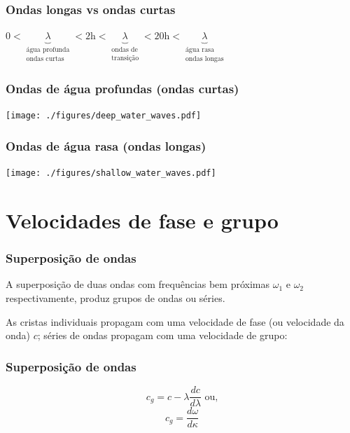 \begin{frame}
\frametitle{Ondas longas vs ondas curtas}
  \small{
  \begin{block}{}
  \begin{center}
    $0 < \underbrace{\lambda}_{\substack{\text{água profunda} \\\text{ondas curtas}}}
    < 2 \text{h} < \underbrace{\lambda}_{\substack{\text{ondas de} \\\text{transição}}}
    < 20 \text{h} < \underbrace{\lambda}_{\substack{\text{água rasa} \\\text{ondas longas}}}$
  \end{center}
  \end{block}
}
\end{frame}


\begin{frame}
\frametitle{Ondas de água profundas (ondas curtas)}
    \begin{center}
        \texttt{[image: ./figures/deep\_water\_waves.pdf]}
    \end{center}
\end{frame}


\begin{frame}
\frametitle{Ondas de água rasa (ondas longas)}
    \begin{center}
        \texttt{[image: ./figures/shallow\_water\_waves.pdf]}
    \end{center}
\end{frame}


\section{Velocidades de fase e grupo}
\begin{frame}
\frametitle{Superposição de ondas}
    \begin{block}{}
        A superposição de duas ondas com frequências bem próximas $\omega_1$ e
        $\omega_2$ respectivamente, produz grupos de ondas ou séries.
    \end{block}

    \pause
    \begin{block}{}
        As cristas individuais propagam com uma velocidade de fase (ou
        velocidade da onda) $c$;  séries de ondas propagam com uma velocidade
        de grupo:
    \end{block}
\end{frame}

\begin{frame}
\frametitle{Superposição de ondas}
    \begin{block}{}
        \begin{center}
            \[
                c_g = c - \lambda \frac{dc}{d\lambda} \text{ ou,}
            \]
            \[
                c_g = \frac{d\omega}{d\kappa}
            \]
        \end{center}
    \end{block}
\end{frame}

